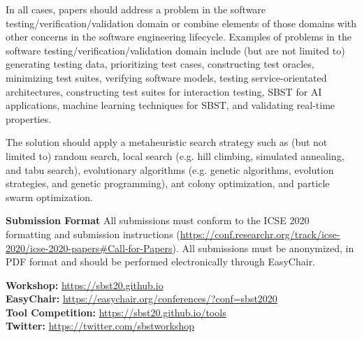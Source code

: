 \documentclass[10pt,conference]{IEEEtran}
\begin{document}
\smallskip \noindent In all cases, papers should address a problem in
the software testing/verification/validation domain or combine
elements of those domains with other concerns in the software
engineering lifecycle. Examples of problems in the software
testing/verification/validation domain include (but are not limited
to) generating testing data, prioritizing test cases, constructing
test oracles, minimizing test suites, verifying software models,
testing service-orientated architectures, constructing test suites for
interaction testing, SBST for AI applications, machine learning techniques for SBST,
and validating real-time properties.

\smallskip \noindent The solution should apply a metaheuristic search
strategy such as (but not limited to) random search, local search
(e.g. hill climbing, simulated annealing, and tabu search),
evolutionary algorithms (e.g. genetic algorithms, evolution
strategies, and genetic programming), ant colony optimization, and
particle swarm optimization.

\smallskip\noindent\textbf{Submission Format}
\noindent All submissions must conform to the ICSE 2020 formatting and
submission instructions
(\url{https://conf.researchr.org/track/icse-2020/icse-2020-papers#Call-for-Papers}). All
submissions must be anonymized, in PDF format and should be performed
electronically through EasyChair.

\smallskip \noindent \textbf{Workshop:} \url{https://sbst20.github.io}\\
\textbf{EasyChair:} \url{https://easychair.org/conferences/?conf=sbst2020}\\
\textbf{Tool Competition:} \url{https://sbst20.github.io/tools}\\
\textbf{Twitter:} \url{https://twitter.com/sbstworkshop}

\end{document}
